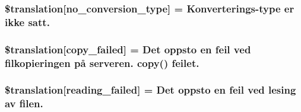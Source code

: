\subsubsection[{\$translation}]{\setlength{\rightskip}{0pt plus 5cm}\$translation\mbox{[}\textquotesingle{}no\+\_\+conversion\+\_\+type\textquotesingle{}\mbox{]} = \textquotesingle{}Konverterings-\/type er ikke satt.\textquotesingle{}}\label{class_8upload_8no___n_o_8php_a4712d7ec28e9a7f17eb3338af2358363}
\hypertarget{class_8upload_8no___n_o_8php_a783c9358bcf54a054545b50098bc679b}{}
\subsubsection[{\$translation}]{\setlength{\rightskip}{0pt plus 5cm}\$translation\mbox{[}\textquotesingle{}copy\+\_\+failed\textquotesingle{}\mbox{]} = \textquotesingle{}Det oppsto en feil ved filkopieringen på serveren. copy() feilet.\textquotesingle{}}\label{class_8upload_8no___n_o_8php_a783c9358bcf54a054545b50098bc679b}
\hypertarget{class_8upload_8no___n_o_8php_a01bea14c9fd5f353f62db44beabfcd42}{}
\subsubsection[{\$translation}]{\setlength{\rightskip}{0pt plus 5cm}\$translation\mbox{[}\textquotesingle{}reading\+\_\+failed\textquotesingle{}\mbox{]} = \textquotesingle{}Det oppsto en feil ved lesing av filen.\textquotesingle{}}\label{class_8upload_8no___n_o_8php_a01bea14c9fd5f353f62db44beabfcd42}
